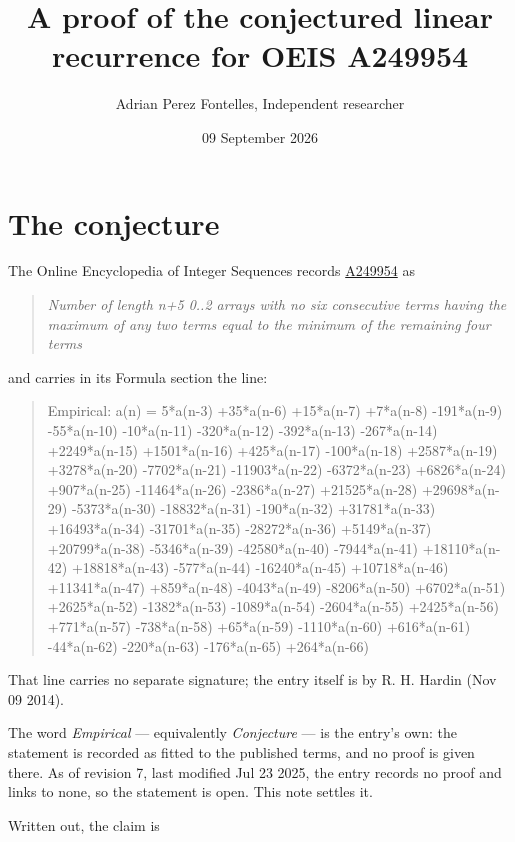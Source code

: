 \documentclass[11pt]{article}
\title{A proof of the conjectured linear recurrence for OEIS A249954}
\author{Adrian Perez Fontelles, Independent researcher}
\date{09 September 2026}
\theoremstyle{definition}
\begin{document}
\maketitle
\section{The conjecture}

The Online Encyclopedia of Integer Sequences records \href{https://oeis.org/A249954}{A249954} as

\begin{quote}\itshape Number of length n+5 0..2 arrays with no six consecutive terms having the maximum of any two terms equal to the minimum of the remaining four terms\end{quote}

and carries in its Formula section the line:

\begin{quote}\ttfamily Empirical: a(n) = 5*a(n-3) +35*a(n-6) +15*a(n-7) +7*a(n-8) -191*a(n-9) -55*a(n-10) -10*a(n-11) -320*a(n-12) -392*a(n-13) -267*a(n-14) +2249*a(n-15) +1501*a(n-16) +425*a(n-17) -100*a(n-18) +2587*a(n-19) +3278*a(n-20) -7702*a(n-21) -11903*a(n-22) -6372*a(n-23) +6826*a(n-24) +907*a(n-25) -11464*a(n-26) -2386*a(n-27) +21525*a(n-28) +29698*a(n-29) -5373*a(n-30) -18832*a(n-31) -190*a(n-32) +31781*a(n-33) +16493*a(n-34) -31701*a(n-35) -28272*a(n-36) +5149*a(n-37) +20799*a(n-38) -5346*a(n-39) -42580*a(n-40) -7944*a(n-41) +18110*a(n-42) +18818*a(n-43) -577*a(n-44) -16240*a(n-45) +10718*a(n-46) +11341*a(n-47) +859*a(n-48) -4043*a(n-49) -8206*a(n-50) +6702*a(n-51) +2625*a(n-52) -1382*a(n-53) -1089*a(n-54) -2604*a(n-55) +2425*a(n-56) +771*a(n-57) -738*a(n-58) +65*a(n-59) -1110*a(n-60) +616*a(n-61) -44*a(n-62) -220*a(n-63) -176*a(n-65) +264*a(n-66)\end{quote}

That line carries no separate signature; the entry itself is by R. H. Hardin (Nov 09 2014).

The word {\itshape Empirical} --- equivalently {\itshape Conjecture} --- is the entry's own: the statement is recorded as fitted to the published terms, and no proof is given there. As of revision 7, last modified Jul 23 2025, the entry records no proof and links to none, so the statement is open. This note settles it.

Written out, the claim is
\end{document}
